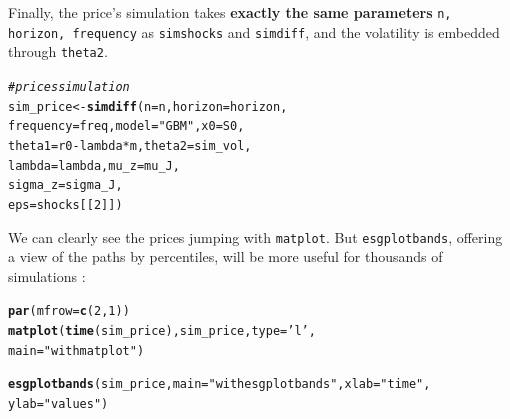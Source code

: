 \documentclass[a4paper]{article}\usepackage[]{graphicx}\usepackage[]{color}
\makeatletter
\newcommand{\hlnum}[1]{\textcolor[rgb]{0.686,0.059,0.569}{#1}}%
\newcommand{\hlstr}[1]{\textcolor[rgb]{0.192,0.494,0.8}{#1}}%
\newcommand{\hlcom}[1]{\textcolor[rgb]{0.678,0.584,0.686}{\textit{#1}}}%
\newcommand{\hlopt}[1]{\textcolor[rgb]{0,0,0}{#1}}%
\newcommand{\hlstd}[1]{\textcolor[rgb]{0.345,0.345,0.345}{#1}}%
\newcommand{\hlkwb}[1]{\textcolor[rgb]{0.69,0.353,0.396}{#1}}%
\newcommand{\hlkwc}[1]{\textcolor[rgb]{0.333,0.667,0.333}{#1}}%
\newcommand{\hlkwd}[1]{\textcolor[rgb]{0.737,0.353,0.396}{\textbf{#1}}}%
\newenvironment{kframe}{%
 \def\at@end@of@kframe{}%
 \ifinner\ifhmode%
  \def\at@end@of@kframe{\end{minipage}}%
  \begin{minipage}{\columnwidth}%
 \fi\fi%
 \def\FrameCommand##1{\hskip\@totalleftmargin \hskip-\fboxsep
 \colorbox{shadecolor}{##1}\hskip-\fboxsep
     \hskip-\linewidth \hskip-\@totalleftmargin \hskip\columnwidth}%
 \MakeFramed {\advance\hsize-\width
   \@totalleftmargin\z@ \linewidth\hsize
   \@setminipage}}%
 {\par\unskip\endMakeFramed%
 \at@end@of@kframe}
\newenvironment{knitrout}{}{} %
\newcommand{\code}[1]{\mbox{\texttt{#1}}}
\makeatother
\begin{document}
Finally, the price's simulation takes {\bf exactly the same parameters} \code{n, horizon, frequency} as \code{simshocks} and \code{simdiff}, and the volatility is embedded through \code{theta2}.

\begin{knitrout}
\color{fgcolor}\begin{kframe}
\begin{alltt}
\hlcom{# prices simulation}
\hlstd{sim_price} \hlkwb{<-} \hlkwd{simdiff}\hlstd{(}\hlkwc{n} \hlstd{= n,} \hlkwc{horizon} \hlstd{= horizon,}
                     \hlkwc{frequency} \hlstd{= freq,} \hlkwc{model} \hlstd{=} \hlstr{"GBM"}\hlstd{,} \hlkwc{x0} \hlstd{= S0,}
                     \hlkwc{theta1} \hlstd{= r0} \hlopt{-} \hlstd{lambda}\hlopt{*}\hlstd{m,} \hlkwc{theta2} \hlstd{= sim_vol,}
                     \hlkwc{lambda} \hlstd{= lambda,} \hlkwc{mu_z} \hlstd{= mu_J,}
                     \hlkwc{sigma_z} \hlstd{= sigma_J,}
                     \hlkwc{eps} \hlstd{= shocks[[}\hlnum{2}\hlstd{]])}
\end{alltt}


{\ttfamily\noindent\bfseries{}}\end{kframe}
\end{knitrout}

We can clearly see the prices jumping with \code{matplot}. But \code{esgplotbands}, offering a view of the paths by percentiles, will be more useful for thousands of simulations : 

\begin{knitrout}
\color{fgcolor}\begin{kframe}
\begin{alltt}
\hlkwd{par}\hlstd{(}\hlkwc{mfrow}\hlstd{=}\hlkwd{c}\hlstd{(}\hlnum{2}\hlstd{,} \hlnum{1}\hlstd{))}
\hlkwd{matplot}\hlstd{(}\hlkwd{time}\hlstd{(sim_price), sim_price,} \hlkwc{type} \hlstd{=} \hlstr{'l'}\hlstd{,}
        \hlkwc{main} \hlstd{=} \hlstr{"with matplot"}\hlstd{)}
\end{alltt}


{\ttfamily\noindent\bfseries\color{errorcolor}{\#\# Error in time(sim\_price): object 'sim\_price' not found}}\begin{alltt}
\hlkwd{esgplotbands}\hlstd{(sim_price,} \hlkwc{main} \hlstd{=} \hlstr{"with esgplotbands"}\hlstd{,} \hlkwc{xlab} \hlstd{=} \hlstr{"time"}\hlstd{,}
             \hlkwc{ylab} \hlstd{=} \hlstr{"values"}\hlstd{)}
\end{alltt}


{\ttfamily\noindent\bfseries\color{errorcolor}{\#\# Error in is.ts(x): object 'sim\_price' not found}}\end{kframe}
\end{knitrout}
\end{document}
